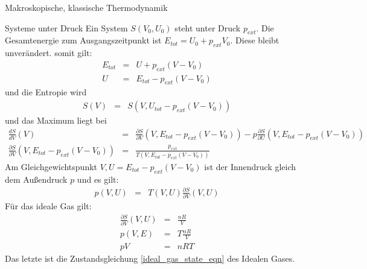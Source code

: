 \begin{chapter}{\titlestr}
\begin{section}{Makroskopische, klassische Thermodynamik}
\begin{subsection}{Systeme unter Druck}
Ein System $S(V_0,U_0)$ steht unter Druck $p_{ext}$. Die Gesamtenergie zum Ausgangszeitpunkt ist $E_{tot}= U_0+p_{ext}V_0$. Diese bleibt unverändert.
somit gilt:
\begin{eqnarray*}
E_{tot} &=& U+p_{ext}(V-V_0)\\
U &=& E_{tot}-p_{ext}(V-V_0)
\end{eqnarray*}
und die Entropie wird
\begin{eqnarray*}
S(V) &=& S(V,U_{tot}-p_{ext}(V-V_0))
\end{eqnarray*}
und das Maximum liegt bei
\begin{eqnarray*}
\frac{dS}{dV}(V) &=& \frac{\partial S}{\partial V}(V,E_{tot}-p_{ext}(V-V_0))-p\frac{\partial S}{\partial U}(V,E_{tot}-p_{ext}(V-V_0))\\
\frac{\partial S}{\partial V}(V,E_{tot}-p_{ext}(V-V_0)) &=& \frac{p_{ext}}{T(V,E_{tot}-p_{ext}(V-V_0))}
\end{eqnarray*}
Am Gleichgewichtspunkt $V,U=E_{tot}-p_{ext}(V-V_0)$ ist der Innendruck gleich dem Außendruck $p$ und es gilt:
\begin{eqnarray*}
p(V,U) &=& T(V,U)\frac{\partial S}{\partial V}(V,U)
\end{eqnarray*}
Für das ideale Gas gilt:
\begin{eqnarray*}
\frac{\partial S}{\partial V}(V,U) &=& \frac{nR}{V}\\
p(V,E) &=& T\frac{nR}{V}\\
pV &=& nRT
\end{eqnarray*}
Das letzte ist die Zustandsgleichung \ref{ideal_gas_state_eqn} des Idealen Gases.
\end{subsection}


\end{section}
\end{chapter}
